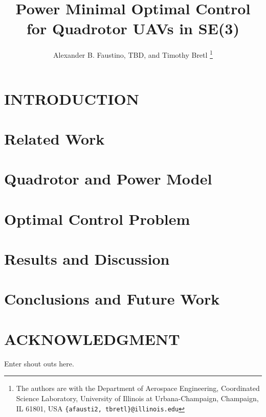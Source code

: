 \documentclass[letterpaper, 10 pt, conference]{ieeeconf}  %
\title{\LARGE \bf
Power Minimal Optimal Control for Quadrotor UAVs in SE(3)
}
\author{Alexander B. Faustino, TBD, and Timothy Bretl%
	\thanks{The authors are with the Department of Aerospace Engineering, Coordinated Science Laboratory, 
		University of Illinois at Urbana-Champaign, Champaign, IL 61801, USA
		\tt\small \{afausti2, tbretl\}@illinois.edu}%
}
\begin{document}
\maketitle
\thispagestyle{empty}
\pagestyle{empty}





\section{INTRODUCTION}
\label{intro}


\section{Related Work}
\label{related}


\section{Quadrotor and Power Model}
\label{model}


\section{Optimal Control Problem}
\label{formulation}


\section{Results and Discussion}
\label{results}


\section{Conclusions and Future Work}
\label{conclusion}






\section*{ACKNOWLEDGMENT}

Enter shout outs here.



\end{document}
